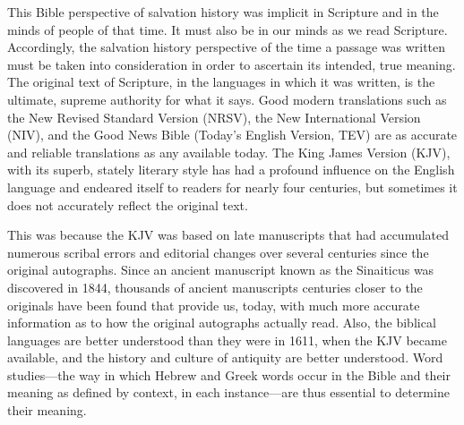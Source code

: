 This Bible perspective of salvation history was implicit in Scripture and in
the minds of people of that time. It must also be in our minds as we read
Scripture. Accordingly, the salvation history perspective of the time a
passage was written must be taken into consideration in order to ascertain
its intended, true meaning.
\newpage
The original text of Scripture, in the languages in which it was written, is
the ultimate, supreme authority for what it says. Good modern translations
such as the New Revised Standard Version (NRSV), the New International 
Version (NIV), and the Good News Bible (Today's English Version, TEV) are as
accurate and reliable translations as any available today. The King James
Version (KJV), with its superb, stately literary style has had a profound
influence on the English language and endeared itself to readers for nearly
four centuries, but sometimes it does not accurately reflect the original
text.

This was because the KJV was based on late manuscripts that had accumulated
numerous scribal errors and editorial changes over several centuries since
the original autographs. Since an ancient manuscript known as the Sinaiticus
was discovered in 1844, thousands of ancient manuscripts centuries closer to
the originals have been found that provide us, today, with much more
accurate information as to how the original autographs actually read.
Also, the biblical languages are better understood than they were in 1611,
when the KJV became available, and the history and culture of antiquity are
better understood. Word studies---the way in which Hebrew and Greek words
occur in the Bible and their meaning as defined by context, in each
instance---are thus essential to determine their meaning.

